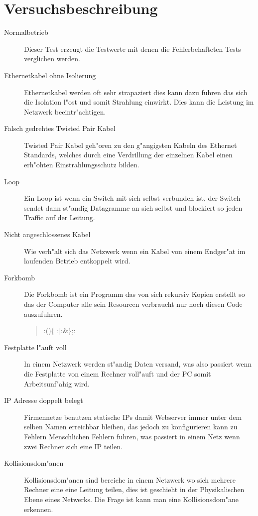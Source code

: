 \section{Versuchsbeschreibung}
\label{sec:versuchbeschreibung}
\begin{description}
\item[Normalbetrieb] Dieser Test erzeugt die Testwerte mit denen die Fehlerbehafteten %
Tests verglichen werden.
\item[Ethernetkabel ohne Isolierung] Ethernetkabel werden oft sehr strapaziert %
dies kann dazu fuhren das sich die Isolation l"ost und somit Strahlung einwirkt. %
Dies kann die Leistung im Netzwerk beeintr"achtigen. 
\item[Falsch gedrehtes Twisted Pair Kabel] Twisted Pair Kabel geh"oren zu den g"angigsten %
Kabeln des Ethernet Standards, welches durch eine Verdrillung der einzelnen Kabel %
einen erh"ohten Einstrahlungsschutz bilden. \autocite{book:CN2003} %
\item[Loop] Ein Loop ist wenn ein Switch mit sich selbst verbunden ist, der Switch sendet %
dann st"andig Datagramme an sich selbst und blockiert so jeden Traffic auf der Leitung. %
\item[Nicht angeschlossenes Kabel] Wie verh"alt sich das Netzwerk wenn ein Kabel von einem %
Endger"at im laufenden Betrieb entkoppelt wird.
\item[Forkbomb] Die Forkbomb ist ein Programm das von sich rekursiv Kopien erstellt %
so das der Computer alle sein Resourcen verbraucht nur noch diesen Code auszufuhren. %
\begin{quote} 
:()\{ :|:\&\};: \autocite{wiki:forkbomb} 
\end{quote}
\item[Festplatte l"auft voll] In einem Netzwerk werden st"andig Daten versand, was also %
passiert wenn die Festplatte von einem Rechner voll"auft und der PC somit Arbeitsunf"ahig wird. %
\item[IP Adresse doppelt belegt] Firmennetze benutzen statische IPs damit Webserver immer unter %
dem selben Namen erreichbar bleiben, das jedoch zu konfigurieren kann zu Fehlern Menschlichen %
Fehlern fuhren, was passiert in einem Netz wenn zwei Rechner sich eine IP teilen. %
\item[Kollisionsdom"anen] Kollisionsdom"anen sind bereiche in einem Netzwerk wo sich mehrere Rechner eine %
eine Leitung teilen, dies ist geschieht in der Physikalischen Ebene eines Netwerks. Die Frage ist kann
man eine Kollisionsdom"ane erkennen. 
\end{description}
